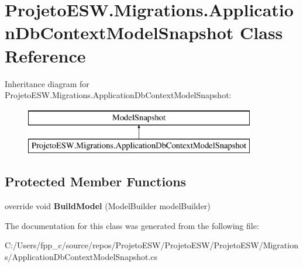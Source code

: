 \hypertarget{class_projeto_e_s_w_1_1_migrations_1_1_application_db_context_model_snapshot}{}\section{Projeto\+E\+S\+W.\+Migrations.\+Application\+Db\+Context\+Model\+Snapshot Class Reference}
\label{class_projeto_e_s_w_1_1_migrations_1_1_application_db_context_model_snapshot}
Inheritance diagram for Projeto\+E\+S\+W.\+Migrations.\+Application\+Db\+Context\+Model\+Snapshot\+:\begin{figure}[H]
\begin{center}
\leavevmode
\includegraphics[height=2.000000cm]{class_projeto_e_s_w_1_1_migrations_1_1_application_db_context_model_snapshot}
\end{center}
\end{figure}
\subsection*{Protected Member Functions}
\begin{DoxyCompactItemize}
\item 
\mbox{\label{class_projeto_e_s_w_1_1_migrations_1_1_application_db_context_model_snapshot_adf9917b1a6dfd32e81699ed25b899d09}} 
override void {\bfseries Build\+Model} (Model\+Builder model\+Builder)
\end{DoxyCompactItemize}


The documentation for this class was generated from the following file\+:\begin{DoxyCompactItemize}
\item 
C\+:/\+Users/fpp\+\_\+c/source/repos/\+Projeto\+E\+S\+W/\+Projeto\+E\+S\+W/\+Projeto\+E\+S\+W/\+Migrations/Application\+Db\+Context\+Model\+Snapshot.\+cs\end{DoxyCompactItemize}
